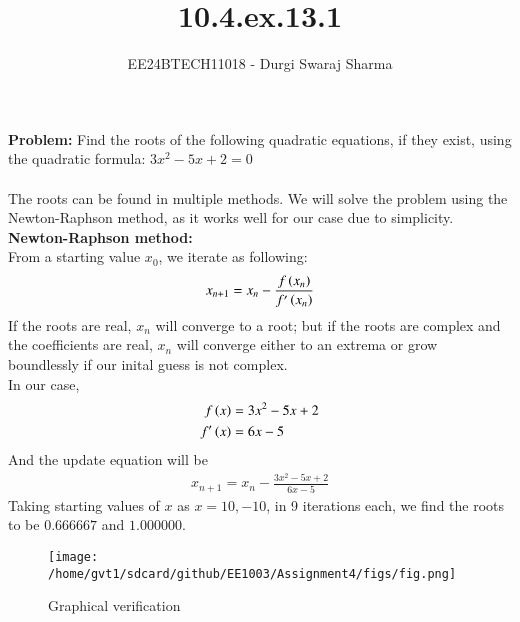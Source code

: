 \documentclass[journal]{IEEEtran}
\begin{document}

\vspace{3cm}

\title{10.4.ex.13.1}
\author{EE24BTECH11018 - Durgi Swaraj Sharma}

{\let\newpage\relax\maketitle}
\renewcommand{\thefigure}{\theenumi}
\renewcommand{\thetable}{\theenumi}
\setlength{\intextsep}{10pt}
\renewcommand{\thetable}{\theenumi}
\textbf{Problem:} Find the roots of the following quadratic equations, if they exist, using the quadratic formula:
 $3x^2-5x+2=0$\\ 
\solution \\
The roots can be found in multiple methods. We will solve the problem using the Newton-Raphson method, as it works well for our case due to simplicity.\\ 
\textbf{Newton-Raphson method:}\\
From a starting value $x_0$, we iterate as following:
\begin{align}
  x_{n+1} = x_n - \frac{f\left(x_n\right)}{f^{\prime}\left(x_n\right)}
\end{align}
If the roots are real, $x_n$ will converge to a root; but if the roots are complex and the coefficients are real, $x_n$ will converge either to an extrema or grow boundlessly if our inital guess is not complex. \\In our case,
\begin{align*}
  f\left(x\right) &= 3x^2-5x+2\\
  f^{\prime}\left(x\right) &= 6x-5
\end{align*}
And the update equation will be
\begin{align}
  x_{n+1} = x_n - \frac{3x^2-5x+2}{6x-5}
\end{align}
Taking starting values of $x$ as $x = 10, -10$, in 9 iterations each, we find the roots to be $0.666667$ and $1.000000$.
\begin{figure}
  \centering
  \texttt{[image: /home/gvt1/sdcard/github/EE1003/Assignment4/figs/fig.png]}
  \caption{Graphical verification}
\end{figure}
\end{document}
